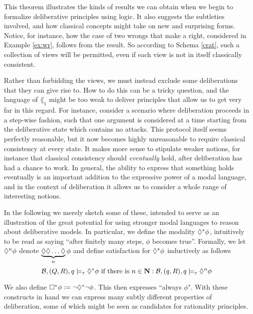 \documentclass[greybox]{svmult}
\newcommand{\views}{\mathcal B}
\newcommand{\sem}{\varepsilon}
\begin{document}
This theorem illustrates the kinds of results we can obtain when we begin to formalize deliberative principles using logic. It also suggests the subtleties involved, and how classical concepts might take on new and surprising forms. Notice, for instance, how the case of two wrongs that make a right, considered in Example \ref{ex:wr}, follows from the result. So according to Schema \ref{crat}, such a collection of views will be permitted, even if each view is not in itself classically consistent.

Rather than forbidding the views, we must instead exclude some deliberations that they can give rise to.
How to do this can be a tricky question, and the language of $\lang_1$ might be too weak to deliver principles  that allow us to get very far in this regard. For instance, consider a scenario where deliberation proceeds in a step-wise fashion, such that one argument is considered at a time starting from the deliberative state which contains no attacks. This protocol itself seems perfectly reasonable, but it now becomes highly unreasonable to require classical consistency at every state. It makes more sense to stipulate weaker notions, for instance that classical consistency should \emph{eventually} hold, after deliberation has had a chance to work. In general, the ability to express that something holds eventually is an important addition to the expressive power of a modal language, and in the context of deliberation it allows us to consider a whole range of interesting notions.

In the following we merely sketch some of these, intended to serve as an illustration of the great potential for using stronger modal languages to reason about deliberative models. In particular, we define the modality $\lozenge^\ast \phi$, intuitively to be read as saying ``after finitely many steps, $\phi$ becomes true''. Formally, we let $\lozenge^n \phi$ denote $\underbrace{\lozenge \lozenge \ldots \lozenge}_n \phi$ and define satisfaction for $\lozenge^\ast \phi$ inductively as follows
\begin{equation}\label{sem:star}
\views,(Q,R),q \models_\sem \adia^\ast\phi \text{ if there is } n \in \mathbf N: \views,(q,R),q\models_\sem \adia^n \phi
\end{equation}

We also define $\square^\ast \phi := \neg \lozenge^\ast \neg \phi$. This then expresses ``always $\phi$". With these constructs in hand we can express many subtly different properties of deliberation, some of which might be seen as candidates for rationality principles.
\end{document}

